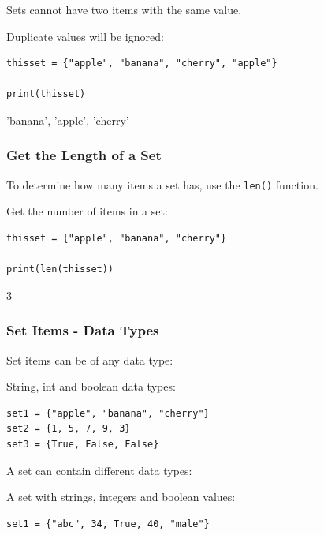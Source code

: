 \documentclass[12pt,a4paper]{article}
\newcommand{\code}[1]{%
	\colorbox{backcolour}{\lstinline{#1}}%
}
\begin{document}
Sets cannot have two items with the same value.

\begin{ebox}
Duplicate values will be ignored:
	\begin{lstlisting}
thisset = {"apple", "banana", "cherry", "apple"}

print(thisset)
	\end{lstlisting}
\tcblower
	\begin{vercode}
{'banana', 'apple', 'cherry'}
	\end{vercode}
\end{ebox}
\subsubsection{Get the Length of a Set}

To determine how many items a set has, use the \code{len()} function.

\begin{ebox}
Get the number of items in a set:
	\begin{lstlisting}
thisset = {"apple", "banana", "cherry"}

print(len(thisset))
	\end{lstlisting}
\tcblower
	\begin{vercode}
3
	\end{vercode}
\end{ebox}
\subsubsection{Set Items - Data Types}

Set items can be of any data type:

\begin{ebox}
String, int and boolean data types:
	\begin{lstlisting}
set1 = {"apple", "banana", "cherry"}
set2 = {1, 5, 7, 9, 3}
set3 = {True, False, False}
	\end{lstlisting}
\end{ebox}

A set can contain different data types:

\begin{ebox}
A set with strings, integers and boolean values:
	\begin{lstlisting}
set1 = {"abc", 34, True, 40, "male"}
	\end{lstlisting}
\end{ebox}
\end{document}
